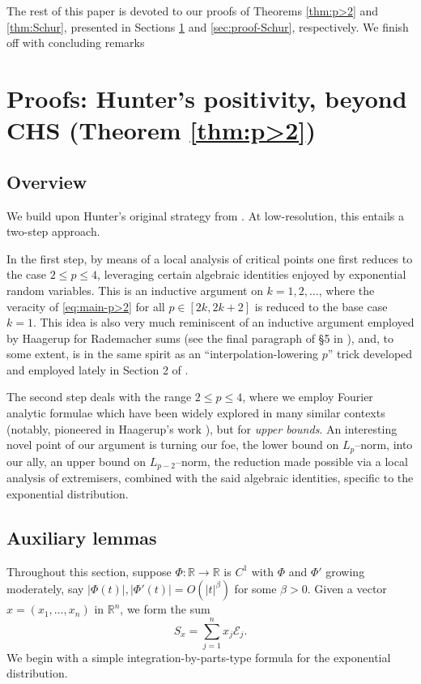 \documentclass[10pt]{article}
\newcommand{\1}{\textbf{1}}
\newcommand{\R}{\mathbb{R}}
\newcommand{\cE}{\mathscr{E}}
\theoremstyle{remark}
\theoremstyle{definition}
\begin{document}
The rest of this paper is devoted to our proofs of Theorems \ref{thm:p>2} and \ref{thm:Schur}, presented in Sections \ref{sec:proof-p>2} and \ref{sec:proof-Schur}, respectively. We finish off with concluding remarks




\section{Proofs: Hunter's positivity, beyond CHS (Theorem \ref{thm:p>2})}\label{sec:proof-p>2}


\subsection{Overview}
We build upon Hunter's original strategy from \cite{Hun}. At low-resolution, this entails a two-step approach. 

In the first step, by means of a local analysis of critical points one first reduces to the case $2 \leq p \leq 4$, leveraging certain algebraic identities enjoyed by exponential random variables. This is an inductive argument on $k = 1, 2, \dots$, where the veracity of \eqref{eq:main-p>2} for all $p \in [2k, 2k+2]$ is reduced to the base case $k=1$. This idea is also very much reminiscent of an inductive argument employed by Haagerup for Rademacher sums (see the final paragraph of \S 5 in \cite{Haa}), and, to some extent, is in the same spirit as an ``interpolation-lowering $p$'' trick developed and employed lately in Section 2 of \cite{BMNO}.

The second step deals with the range $2 \leq p \leq 4$, where we employ Fourier analytic formulae which have been widely explored in many similar contexts (notably, pioneered in Haagerup's work \cite{Haa}), but for \emph{upper bounds}. An interesting novel point of our argument is turning our foe, the lower bound on $L_p$--norm, into our ally, an upper bound on $L_{p-2}$--norm, the reduction made possible via a local analysis of extremisers, combined with the said algebraic identities, specific to the exponential distribution.



\subsection{Auxiliary lemmas}

Throughout this section, suppose $\Phi\colon \R\to \R$ is $C^1$ with $\Phi$ and $\Phi'$ growing moderately, say $|\Phi(t)|, |\Phi'(t)| = O(|t|^\beta)$ for some $\beta > 0$. Given a vector $x = (x_1, \dots, x_n)$ in $\R^n$, we form the sum
\[
S_x = \sum_{j=1}^n x_j\cE_j.
\]
We begin with a simple integration-by-parts-type formula for the exponential distribution.
\end{document}
